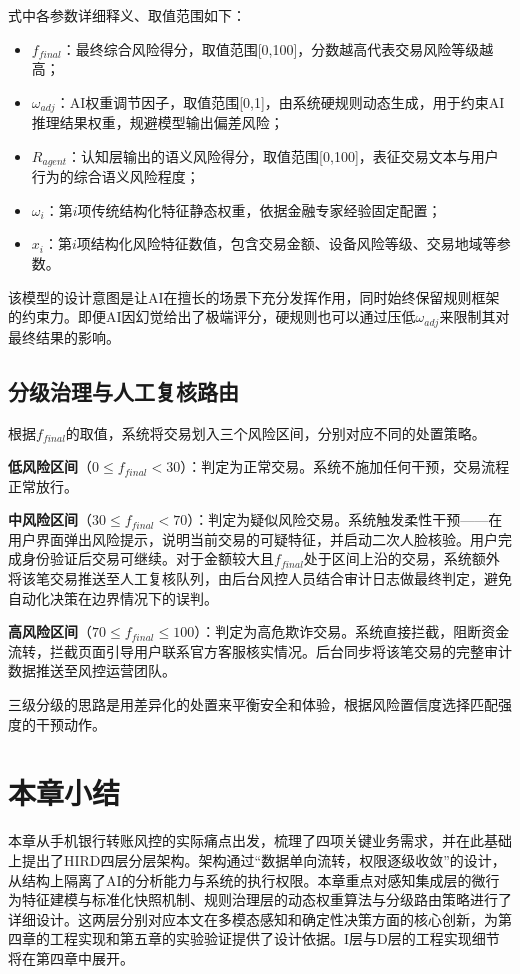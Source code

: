 \documentclass[twoside,openright]{xduugthesis}
\begin{document}
式中各参数详细释义、取值范围如下：

\begin{itemize}
    \item $f_{final}$：最终综合风险得分，取值范围[0,100]，分数越高代表交易风险等级越高；
    \item $\omega_{adj}$：AI权重调节因子，取值范围[0,1]，由系统硬规则动态生成，用于约束AI推理结果权重，规避模型输出偏差风险；
    \item $R_{agent}$：认知层输出的语义风险得分，取值范围[0,100]，表征交易文本与用户行为的综合语义风险程度；
    \item $\omega_i$：第$i$项传统结构化特征静态权重，依据金融专家经验固定配置；
    \item $x_i$：第$i$项结构化风险特征数值，包含交易金额、设备风险等级、交易地域等参数。
\end{itemize}

该模型的设计意图是让AI在擅长的场景下充分发挥作用，同时始终保留规则框架的约束力。即便AI因幻觉给出了极端评分，硬规则也可以通过压低$\omega_{adj}$来限制其对最终结果的影响。

\subsection{分级治理与人工复核路由}

根据$f_{final}$的取值，系统将交易划入三个风险区间，分别对应不同的处置策略。

\textbf{低风险区间}（$0 \le f_{final} < 30$）：判定为正常交易。系统不施加任何干预，交易流程正常放行。

\textbf{中风险区间}（$30 \le f_{final} < 70$）：判定为疑似风险交易。系统触发柔性干预——在用户界面弹出风险提示，说明当前交易的可疑特征，并启动二次人脸核验。用户完成身份验证后交易可继续。对于金额较大且$f_{final}$处于区间上沿的交易，系统额外将该笔交易推送至人工复核队列，由后台风控人员结合审计日志做最终判定，避免自动化决策在边界情况下的误判。

\textbf{高风险区间}（$70 \le f_{final} \le 100$）：判定为高危欺诈交易。系统直接拦截，阻断资金流转，拦截页面引导用户联系官方客服核实情况。后台同步将该笔交易的完整审计数据推送至风控运营团队。

三级分级的思路是用差异化的处置来平衡安全和体验，根据风险置信度选择匹配强度的干预动作。

\section{本章小结}

本章从手机银行转账风控的实际痛点出发，梳理了四项关键业务需求，并在此基础上提出了HIRD四层分层架构。架构通过“数据单向流转，权限逐级收敛”的设计，从结构上隔离了AI的分析能力与系统的执行权限。本章重点对感知集成层的微行为特征建模与标准化快照机制、规则治理层的动态权重算法与分级路由策略进行了详细设计。这两层分别对应本文在多模态感知和确定性决策方面的核心创新，为第四章的工程实现和第五章的实验验证提供了设计依据。I层与D层的工程实现细节将在第四章中展开。
\end{document}
